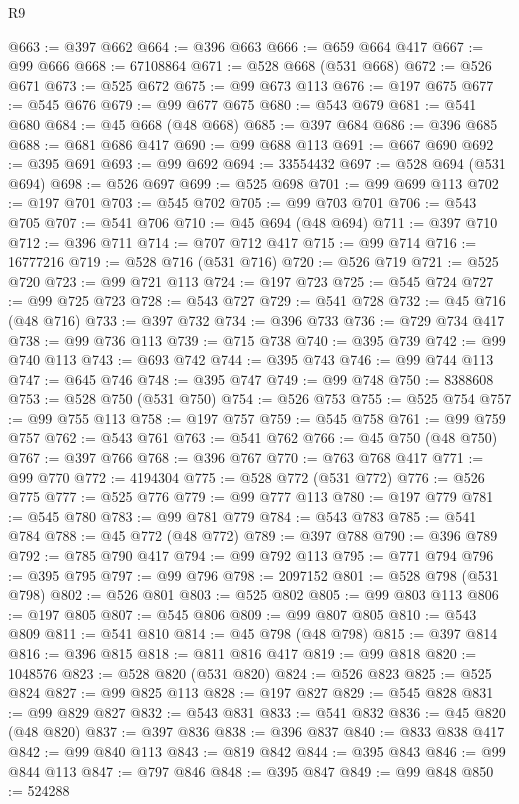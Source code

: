 \begin{lexlean}{R9}
\begin{coremodule}
{{{{{{{{{{{{{{{{{{{{{{{{{{{{{{{{{{{{{{{{{{{{{{{{{{{{{{{{{{{{{{{{{{{{{{{{{{{{{{{{{{{{@663 := @397 @662
@664 := @396 @663
@666 := @659 @664 @417
@667 := @99 @666
@668 := 67108864
@671 := @528 @668 (@531 @668)
@672 := @526 @671
@673 := @525 @672
@675 := @99 @673 @113
@676 := @197 @675
@677 := @545 @676
@679 := @99 @677 @675
@680 := @543 @679
@681 := @541 @680
@684 := @45 @668 (@48 @668)
@685 := @397 @684
@686 := @396 @685
@688 := @681 @686 @417
@690 := @99 @688 @113
@691 := @667 @690
@692 := @395 @691
@693 := @99 @692
@694 := 33554432
@697 := @528 @694 (@531 @694)
@698 := @526 @697
@699 := @525 @698
@701 := @99 @699 @113
@702 := @197 @701
@703 := @545 @702
@705 := @99 @703 @701
@706 := @543 @705
@707 := @541 @706
@710 := @45 @694 (@48 @694)
@711 := @397 @710
@712 := @396 @711
@714 := @707 @712 @417
@715 := @99 @714
@716 := 16777216
@719 := @528 @716 (@531 @716)
@720 := @526 @719
@721 := @525 @720
@723 := @99 @721 @113
@724 := @197 @723
@725 := @545 @724
@727 := @99 @725 @723
@728 := @543 @727
@729 := @541 @728
@732 := @45 @716 (@48 @716)
@733 := @397 @732
@734 := @396 @733
@736 := @729 @734 @417
@738 := @99 @736 @113
@739 := @715 @738
@740 := @395 @739
@742 := @99 @740 @113
@743 := @693 @742
@744 := @395 @743
@746 := @99 @744 @113
@747 := @645 @746
@748 := @395 @747
@749 := @99 @748
@750 := 8388608
@753 := @528 @750 (@531 @750)
@754 := @526 @753
@755 := @525 @754
@757 := @99 @755 @113
@758 := @197 @757
@759 := @545 @758
@761 := @99 @759 @757
@762 := @543 @761
@763 := @541 @762
@766 := @45 @750 (@48 @750)
@767 := @397 @766
@768 := @396 @767
@770 := @763 @768 @417
@771 := @99 @770
@772 := 4194304
@775 := @528 @772 (@531 @772)
@776 := @526 @775
@777 := @525 @776
@779 := @99 @777 @113
@780 := @197 @779
@781 := @545 @780
@783 := @99 @781 @779
@784 := @543 @783
@785 := @541 @784
@788 := @45 @772 (@48 @772)
@789 := @397 @788
@790 := @396 @789
@792 := @785 @790 @417
@794 := @99 @792 @113
@795 := @771 @794
@796 := @395 @795
@797 := @99 @796
@798 := 2097152
@801 := @528 @798 (@531 @798)
@802 := @526 @801
@803 := @525 @802
@805 := @99 @803 @113
@806 := @197 @805
@807 := @545 @806
@809 := @99 @807 @805
@810 := @543 @809
@811 := @541 @810
@814 := @45 @798 (@48 @798)
@815 := @397 @814
@816 := @396 @815
@818 := @811 @816 @417
@819 := @99 @818
@820 := 1048576
@823 := @528 @820 (@531 @820)
@824 := @526 @823
@825 := @525 @824
@827 := @99 @825 @113
@828 := @197 @827
@829 := @545 @828
@831 := @99 @829 @827
@832 := @543 @831
@833 := @541 @832
@836 := @45 @820 (@48 @820)
@837 := @397 @836
@838 := @396 @837
@840 := @833 @838 @417
@842 := @99 @840 @113
@843 := @819 @842
@844 := @395 @843
@846 := @99 @844 @113
@847 := @797 @846
@848 := @395 @847
@849 := @99 @848
@850 := 524288
}}}}}}}}}}}}}}}}}}}}}}}}}}}}}}}}}}}}}}}}}}}}}}}}}}}}}}}}}}}}}}}}}}}}}}}}}}}}}}}}}}}}
\end{coremodule}
\end{lexlean}

